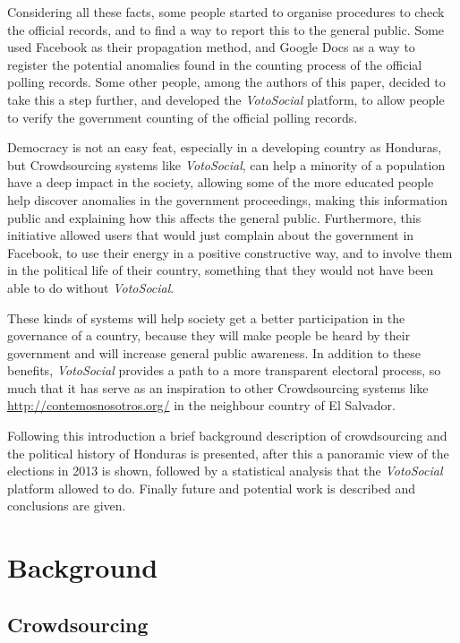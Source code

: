 \documentclass[letterpaper,10pt]{article}
\begin{document}
Considering all these facts, some people started to organise procedures to check the official records, and to find a way to report this to the general public. Some used Facebook as their propagation method, and Google Docs as a way to register the potential anomalies found in the counting process of the official polling records. Some other people, among the authors of this paper, decided to take this a step further, and developed the \textit{VotoSocial} platform, to allow people to verify the government counting of the official polling records.

Democracy is not an easy feat, especially in a developing country as Honduras, but Crowdsourcing systems like \textit{VotoSocial}, can help a minority of a population have a deep impact in the society, allowing some of the more educated people help discover anomalies in the government proceedings, making this information public and explaining how this affects the general public. Furthermore, this initiative allowed users that would just complain about the government in Facebook, to use their energy in a positive constructive way, and to involve them in the political life of their country, something that they would not have been able to do without \textit{VotoSocial}.

These kinds of systems will help society get a better participation in the governance of a country, because they will make people be heard by their government and will increase general public awareness. In addition to these benefits, \textit{VotoSocial} provides a path to a more transparent electoral process, so much that it has serve as an inspiration to other Crowdsourcing systems like \url{http://contemosnosotros.org/} in the neighbour country of El Salvador. 

Following this introduction a brief background description of crowdsourcing and the political history of Honduras is presented, after this a panoramic view of the elections in 2013 is shown, followed by a statistical analysis that the \textit{VotoSocial} platform allowed to do. Finally future and potential work is described and conclusions are given.


\section{Background}

\subsection{Crowdsourcing}
\end{document}
